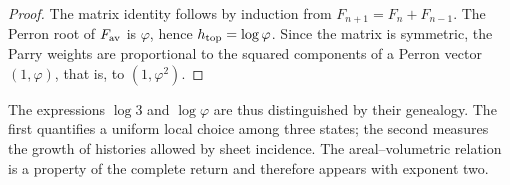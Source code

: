 \begin{proof}
The matrix identity follows by induction from
\(F_{n+1}=F_n+F_{n-1}\). The Perron root of \(F_{\rm av}\) is \(\varphi\),
hence \(h_{\rm top}=\log\varphi\). Since the matrix is symmetric, the Parry
weights \cite{Parry1964} are proportional to the squared components of a Perron vector
\((1,\varphi)\), that is, to \((1,\varphi^2)\).
\end{proof}

The expressions \(\log3\) and \(\log\varphi\) are thus distinguished by their
genealogy. The first quantifies a uniform local choice among three
states; the second measures the growth of histories allowed by
sheet incidence. The areal--volumetric relation is a property of the
complete return and therefore appears with exponent two.
